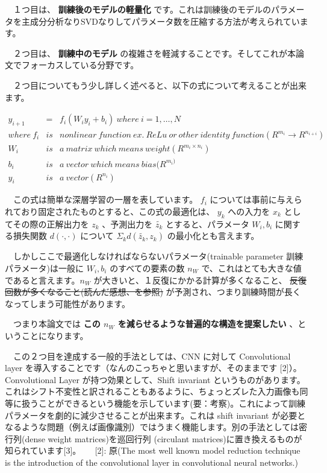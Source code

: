 \documentclass{article}
\begin{document}
　１つ目は、 \textbf{訓練後のモデルの軽量化} です。これは訓練後のモデルのパラメータを主成分分析なりSVDなりしてパラメータ数を圧縮する方法が考えられています。

　２つ目は、 \textbf{訓練中のモデル} の複雑さを軽減することです。そしてこれが本論文でフォーカスしている分野です。

　２つ目についてもう少し詳しく述べると、以下の式について考えることが出来ます。

\begin{eqnarray}
  y_{i+1} &=& f_i (W_i y_i + b_i)\ where\ i = 1, \dots, N \\
  where\ f_i &is& nonlinear\ function\ ex.\ ReLu\ or\ other\ identity\ function(R^{m_i}\rightarrow R^{n_{i+i}})\nonumber \\
         W_i &is& a\ matrix\ which\ means\ weight (R^{m_i\times n_i})\nonumber \\
         b_i &is& a\ vector\ which\ means\ bias (R^{m_i)}\nonumber \\
         y_i &is& a\ vector (R^{n_i})\nonumber
\end{eqnarray}

　この式は簡単な深層学習の一層を表しています。 \(f_i\) については事前に与えられており固定されたものとすると、この式の最適化は、 \(y_k\) への入力を \(x_k\) としてその際の正解出力を \(z_k\) 、予測出力を \(\tilde{z_k}\) とすると、パラメータ \(W_i, b_i\) に関する損失関数 \(d(\cdot, \cdot)\) について \(\Sigma_{k} d(\tilde{z_k}, z_k)\) の最小化とも言えます。

　しかしここで最適化しなければならないパラメータ(trainable parameter 訓練パラメータ)は一般に \(W_i, b_i\) のすべての要素の数 \(n_W\) で、これはとても大きな値であると言えます。\(n_W\) が大きいと、１反復にかかる計算が多くなること、 \sout{反復回数が多くなること(読んだ感想、を参照)} が予測され、つまり訓練時間が長くなってしまう可能性があります。

　つまり本論文では \textbf{この \(n_W\) を減らせるような普遍的な構造を提案したい} 、ということになります。

　この２つ目を達成する一般的手法としては、CNN に対して Convolutional layer を導入することです（なんのこっちゃと思いますが、そのままです [2]）。Convolutional Layer が持つ効果として、Shift invariant というものがあります。これはシフト不変性と訳されることもあるように、ちょっとズレた入力画像も同等に扱うことができるという機能を示しています(要：考察)。これによって訓練パラメータを劇的に減少させることが出来ます。これは shift invariant が必要となるような問題（例えば画像識別）ではうまく機能します。別の手法としては密行列(dense weight matrices)を巡回行列 (circulant matrices)に置き換えるものが知られています[3]。
  　
[2]: 原(The most well known model reduction technique is the introduction of the convolutional layer in convolutional neural networks.)
\end{document}
